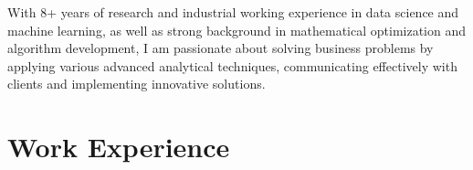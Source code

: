 \documentclass[11pt,a4paper,sans]{moderncv}        %
\begin{document}
\makecvtitle
\vspace*{-8mm}
\small{With 8+ years of research and industrial working experience in data science and machine learning, as well as strong background in mathematical optimization and algorithm development, I am passionate about solving business problems by applying various advanced analytical techniques, communicating effectively with clients and implementing innovative solutions.}

\section{Work Experience}

\vspace{6pt}
\end{document}
